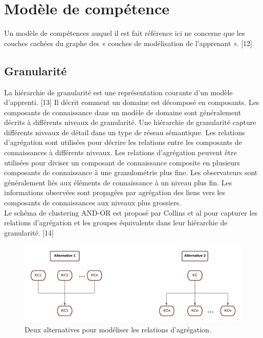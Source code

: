 \section{Modèle de compétence}
Un modèle de compétences auquel il est fait référence ici ne concerne que les couches cachées du graphe des « couches de modélisation de l'apprenant ». [12]

\subsection{Granularité}
La hiérarchie de granularité est une représentation courante d'un modèle d'apprenti. [13] Il décrit comment un domaine est décomposé en composants. Les composants de connaissance dans un modèle de domaine sont généralement décrits à différents niveaux de granularité. Une hiérarchie de granularité capture différents niveaux de détail dans un type de réseau sémantique. Les relations d'agrégation sont utilisées pour décrire les relations entre les composants de connaissances à différents niveaux. Les relations d'agrégation peuvent être utilisées pour diviser un composant de connaissance composite en plusieurs composants de connaissance à une granulométrie plus fine. Les observateurs sont généralement liés aux éléments de connaissance à un niveau plus fin. Les informations observées sont propagées par agrégation des liens vers les composants de connaissances aux niveaux plus grossiers.\\
Le schéma de clustering AND-OR est proposé par Collins et al pour capturer les relations d'agrégation et les groupes équivalents dans leur hiérarchie de granularité. [14]
\begin{figure}[H]
	\begin{center}
		\includegraphics[width=\textwidth]{images/chapitre2/Two_Aggregation_relationships.png}
	\end{center}
\caption{Deux alternatives pour modéliser les relations d'agrégation.}
\label{two_agregationrelationships}
\end{figure}

